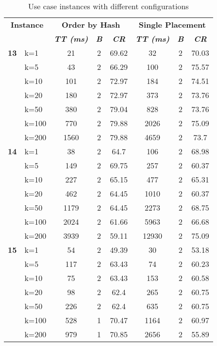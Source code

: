 \begin{table}[htbp]
    \caption{Use case instances with different configurations}
    \begin{tabular}{ll|ccc|ccc}
    
    \multicolumn{ 2}{c|}{\textbf{Instance}} & \multicolumn{ 3}{c|}{\textbf{Order by Hash}} & \multicolumn{ 3}{c}{\textbf{Single Placement}} \\ 
    \multicolumn{ 2}{l|}{} & \textbf{\textit{TT (ms)}} & \textbf{\textit{B}} & \textbf{\textit{CR}} & \textbf{\textit{TT (ms)}} & \textbf{\textit{B}} & \textbf{\textit{CR}} \\ \hline
    \multicolumn{1}{r}{\textbf{13}} & k=1 & 21 & 2 & 69.62 & 32 & 2 & 70.03 \\ 
     & k=5 & 43 & 2 & 66.29 & 100 & 2 & 75.57 \\ 
     & k=10 & 101 & 2 & 72.97 & 184 & 2 & 74.51 \\ 
     & k=20 & 180 & 2 & 72.97 & 373 & 2 & 73.76 \\ 
     & k=50 & 380 & 2 & 79.04 & 828 & 2 & 73.76 \\ 
     & k=100 & 770 & 2 & 79.88 & 2026 & 2 & 75.09 \\ 
     & k=200 & 1560 & 2 & 79.88 & 4659 & 2 & 73.7 \\ \hline
    \multicolumn{1}{r}{\textbf{14}} & k=1 & 38 & 2 & 64.7 & 106 & 2 & 68.98 \\ 
     & k=5 & 149 & 2 & 69.75 & 257 & 2 & 60.37 \\ 
     & k=10 & 227 & 2 & 65.15 & 477 & 2 & 65.31 \\ 
     & k=20 & 462 & 2 & 64.45 & 1010 & 2 & 60.37 \\ 
     & k=50 & 1179 & 2 & 64.45 & 2273 & 2 & 68.75 \\ 
     & k=100 & 2024 & 2 & 61.66 & 5963 & 2 & 66.68 \\ 
     & k=200 & 3939 & 2 & 59.11 & 12930 & 2 & 75.09 \\ \hline
    \multicolumn{1}{r}{\textbf{15}} & k=1 & 54 & 2 & 49.39 & 30 & 2 & 53.18 \\ 
     & k=5 & 117 & 2 & 63.43 & 74 & 2 & 60.23 \\ 
     & k=10 & 75 & 2 & 63.43 & 153 & 2 & 60.58 \\ 
     & k=20 & 98 & 2 & 62.4 & 265 & 2 & 60.75 \\ 
     & k=50 & 226 & 2 & 62.4 & 635 & 2 & 60.75 \\ 
     & k=100 & 528 & 1 & 70.47 & 1164 & 2 & 60.97 \\ 
     & k=200 & 979 & 1 & 70.85 & 2656 & 2 & 55.89 \\ \hline

\end{tabular}
\end{table}
